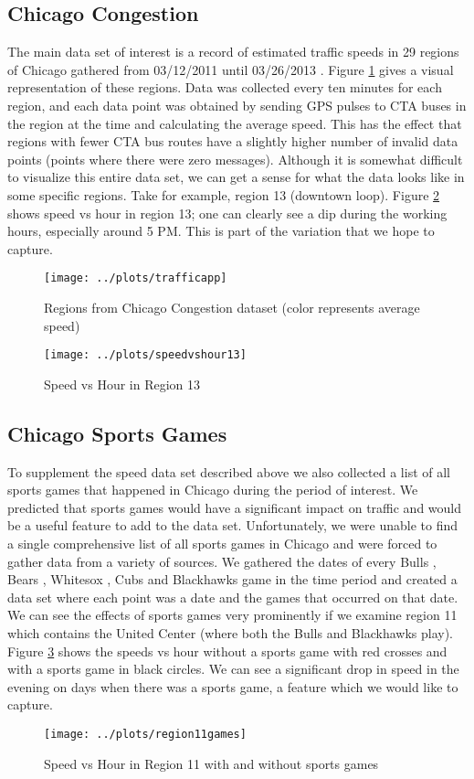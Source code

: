 \documentclass[12pt]{article}
\begin{document}
\subsection{Chicago Congestion}
The main data set of interest is a record of estimated traffic speeds in 29 regions of Chicago gathered from 03/12/2011 until 03/26/2013 \cite{regiondataset}. Figure \ref{appscreenshot} gives a visual representation of these regions. Data was collected every ten minutes for each region, and each data point was obtained by sending GPS pulses to CTA buses in the region at the time and calculating the average speed. This has the effect that regions with fewer CTA bus routes have a slightly higher number of invalid data points (points where there were zero messages). Although it is somewhat difficult to visualize this entire data set, we can get a sense for what the data looks like in some specific regions. Take for example, region 13 (downtown loop). Figure \ref{speedvshour13} shows speed vs hour in region 13; one can clearly see a dip during the working hours, especially around 5 PM. This is part of the variation that we hope to capture.
\begin{figure}[!ht]
\centering
\texttt{[image: ../plots/trafficapp]}
\caption{Regions from Chicago Congestion dataset (color represents average speed)}
\label{appscreenshot}
\end{figure}
\begin{figure}[!ht]
\centering
\texttt{[image: ../plots/speedvshour13]}
\caption{Speed vs Hour in Region 13}
\label{speedvshour13}
\end{figure}
\subsection{Chicago Sports Games}
To supplement the speed data set described above we also collected a list of all sports games that happened in Chicago during the period of interest. We predicted that sports games would have a significant impact on traffic and would be a useful feature to add to the data set. Unfortunately, we were unable to find a single comprehensive list of all sports games in Chicago and were forced to gather data from a variety of sources. We gathered the dates of every Bulls \cite{bullsdata}, Bears \cite{bearsdata}, Whitesox \cite{whitesoxdata}, Cubs \cite{cubsdata} and Blackhawks \cite{blackhawksdata} game in the time period and created a data set where each point was a date and the games that occurred on that date. We can see the effects of sports games very prominently if we examine region 11 which contains the United Center (where both the Bulls and Blackhawks play). Figure \ref{region11games} shows the speeds vs hour without a sports game with red crosses and with a sports game in black circles. We can see a significant drop in speed in the evening on days when there was a sports game, a feature which we would like to capture.
\begin{figure}[!ht]
\centering
\texttt{[image: ../plots/region11games]}
\caption{Speed vs Hour in Region 11 with and without sports games}
\label{region11games}
\end{figure}
\end{document}
